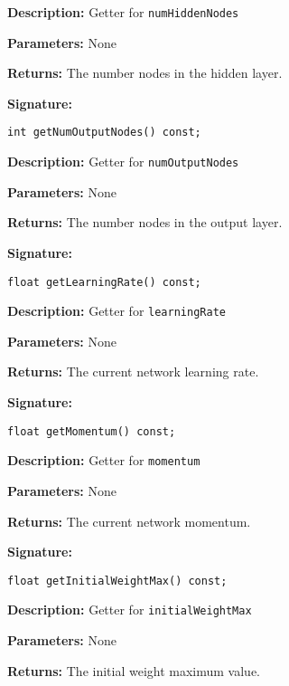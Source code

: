 \documentclass[a4paper]{article}
\begin{document}
\textbf{Description: }
Getter for \lstinline{numHiddenNodes}

\textbf{Parameters: } None

\textbf{Returns: }
The number nodes in the hidden layer.

\hrulefill %

\textbf{Signature:} \begin{lstlisting}
int getNumOutputNodes() const;
\end{lstlisting}

\textbf{Description: }
Getter for \lstinline{numOutputNodes}

\textbf{Parameters: } None

\textbf{Returns: }
The number nodes in the output layer.

\hrulefill %

\textbf{Signature:} \begin{lstlisting}
float getLearningRate() const;
\end{lstlisting}

\textbf{Description: }
Getter for \lstinline{learningRate}

\textbf{Parameters: } None

\textbf{Returns: }
The current network learning rate.

\hrulefill %

\textbf{Signature:} \begin{lstlisting}
float getMomentum() const;
\end{lstlisting}

\textbf{Description: }
Getter for \lstinline{momentum}

\textbf{Parameters: } None

\textbf{Returns: }
The current network momentum.

\hrulefill %

\textbf{Signature:} \begin{lstlisting}
float getInitialWeightMax() const;
\end{lstlisting}

\textbf{Description: }
Getter for \lstinline{initialWeightMax}

\textbf{Parameters: } None

\textbf{Returns: }
The initial weight maximum value.
\end{document}
